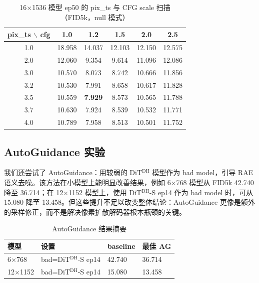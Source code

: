 \documentclass[11pt]{article}
\begin{document}
\begin{table}[H]
\centering
\caption{16$\times$1536 模型 ep50 的 pix\_ts 与 CFG scale 扫描（FID5k，null 模式）}
\label{tab:1536-pixts-cfg}
\begin{tabular}{cccccc}
\toprule
pix\_ts $\backslash$ cfg & 1.0 & 1.2 & 1.5 & 2.0 & 2.5 \\
\midrule
1.0 & 18.958 & 14.037 & 12.103 & 12.150 & 12.575 \\
2.0 & 12.060 & 9.354 & 9.614 & 11.096 & 12.086 \\
3.0 & 10.570 & 8.073 & 8.742 & 10.666 & 11.856 \\
3.2 & 10.530 & 7.991 & 8.658 & 10.617 & 11.828 \\
3.5 & 10.559 & \textbf{7.929} & 8.573 & 10.565 & 11.788 \\
3.7 & 10.630 & 7.924 & 8.539 & 10.532 & 11.771 \\
4.0 & 10.789 & 7.958 & 8.513 & 10.501 & 11.752 \\
\bottomrule
\end{tabular}
\end{table}

\subsection{AutoGuidance 实验}
\label{app:ag-details}

我们还尝试了 AutoGuidance：用较弱的 DiT$^{\mathrm{DH}}$ 模型作为 bad model，引导 RAE 语义去噪。该方法在小模型上能明显改善结果，例如 6$\times$768 模型从 FID5k 42.740 降至 36.714；在 12$\times$1152 模型上，使用 DiT$^{\mathrm{DH}}$-S ep14 作为 bad model 时，可从 15.080 降至 13.458。但这些提升不足以改变整体结论：AutoGuidance 更像是额外的采样修正，而不是解决像素扩散解码器根本瓶颈的关键。

\begin{table}[H]
\centering
\caption{AutoGuidance 结果摘要}
\begin{tabular}{llll}
\toprule
模型 & 设置 & baseline & 最佳 AG \\
\midrule
6$\times$768 & bad=DiT$^{\mathrm{DH}}$-S ep14 & 42.740 & 36.714 \\
12$\times$1152 & bad=DiT$^{\mathrm{DH}}$-S ep14 & 15.080 & 13.458 \\
\bottomrule
\end{tabular}
\end{table}
\end{document}
